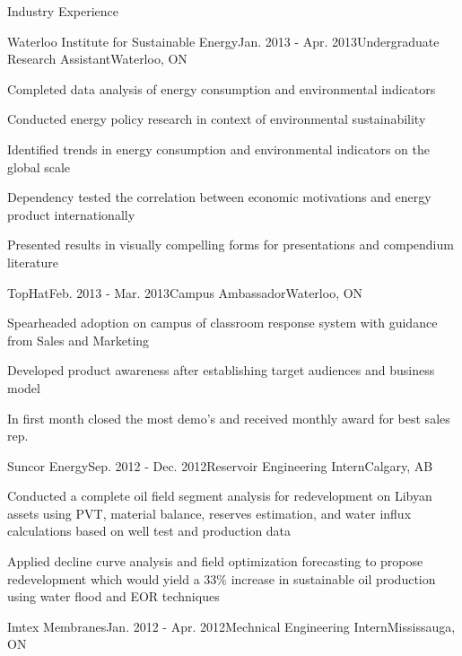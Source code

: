 \documentclass{resume} %
\begin{document}
\begin{rSection}{Industry Experience}

\begin{rSubsection}{Waterloo Institute for Sustainable Energy}{Jan. 2013 - Apr. 2013}{Undergraduate Research Assistant}{Waterloo, ON}
\item Completed data analysis of energy consumption and environmental indicators
\item Conducted energy policy research in context of environmental sustainability
\item Identified trends in energy consumption and environmental indicators on the global scale 
\item Dependency tested the correlation between economic motivations and energy product internationally 
\item Presented results in visually compelling forms for presentations and compendium literature

\end{rSubsection}


\begin{rSubsection}{TopHat}{Feb. 2013 - Mar. 2013}{Campus Ambassador}{Waterloo, ON}
\item Spearheaded adoption on campus of classroom response system with guidance from Sales and Marketing
\item Developed product awareness after establishing target audiences and business model
\item In first month closed the most demo's and received monthly award for best sales rep.
\end{rSubsection}


\begin{rSubsection}{Suncor Energy}{Sep. 2012 - Dec. 2012}{Reservoir Engineering Intern}{Calgary, AB}
\item Conducted a complete oil field segment analysis for redevelopment on Libyan assets using PVT, material balance, reserves estimation, and water influx calculations based on well test and production data 
\item Applied decline curve analysis and field optimization forecasting to propose redevelopment which would yield a 33\% increase in sustainable oil production using water flood and EOR techniques
\end{rSubsection}


\begin{rSubsection}{Imtex Membranes}{Jan. 2012 - Apr. 2012}{Mechnical Engineering Intern}{Mississauga, ON}


\end{rSubsection}
\end{rSection}
\end{document}
